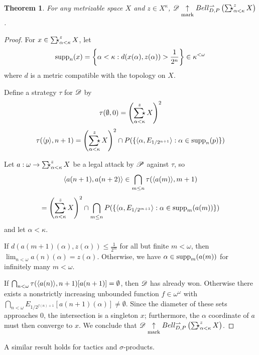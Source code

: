\documentclass{amsart}
\newtheorem{theorem}{Theorem}[section]
\theoremstyle{definition}
\begin{document}
  \begin{theorem}
    For any metrizable space \(X\) and \(z\in X^\kappa\),
    \(\pl D\markwin\bellConGame{\SigmaStarProd_{\alpha<\kappa}^z X}\).
  \end{theorem}

  \begin{proof}
    For \(x\in\SigmaStarProd_{\alpha<\kappa}^z X\), let
      \[
        \textrm{supp}_n(x)
          =
        \left\{
          \alpha<\kappa
        :
          d(x(\alpha),z(\alpha))>\frac{1}{2^n}
        \right\}
          \in
        \kappa^{<\omega}
      \]
    where \(d\) is a metric compatible with the topology on \(X\).

    Define a strategy \(\tau\) for \(\mathscr{D}\) by
      \[
        \tau(\emptyset,0)
          =
        \left(\SigmaStarProd_{\alpha<\kappa}^z X\right)^2
      \]
      \[
        \tau(\<p\>,n+1)
          =
        \left(\SigmaStarProd_{\alpha<\kappa}^z X\right)^2
          \cap
        P(\{
          \<\alpha,E_{1/2^{n+1}}\>
            :
          \alpha\in\supp_n(p)
        \})
      \]

    Let \(a:\omega\to \SigmaStarProd_{\alpha<\kappa}^z X\) be a legal
    attack by \(\mathscr{P}\) against \(\tau\), so
      \[
        \langle a(n+1),a(n+2)\rangle
          \in
        \bigcap_{m\leq n}
        \tau(\langle a(m)\rangle,m+1)
      \]
      \[
          =
        \left(\SigmaStarProd_{\alpha<\kappa}^z X\right)^2
          \cap
        \bigcap_{m\leq n}
        P(\{
          \<\alpha,E_{1/2^{m+1}}\>
            :
          \alpha\in\supp_m(a(m))
        \})
      \]
    and let \(\alpha<\kappa\).

    If \(d(a(m+1)(\alpha),z(\alpha))\leq\frac{1}{2^m}\) for all but finite
    \(m<\omega\), then  \(\lim_{n<\omega}a(n)(\alpha)=z(\alpha)\).
    Otherwise, we have \(\alpha\in\textrm{supp}_m(a(m))\) for infinitely many
    \(m<\omega\).

    If
    \(\bigcap_{n<\omega}\tau(\langle a(n)\rangle,n+1)[a(n+1)]=\emptyset\), then
    \(\mathscr{D}\) has already won.
    Otherwise there exists a nonstrictly increasing
    unbounded function \(f\in\omega^\omega\) with
    \(\bigcap_{n<\omega}E_{1/2^{f(n)+1}}[a(n+1)(\alpha)]\not=\emptyset\).
    Since the diameter of these sets approaches \(0\), the intersection is
    a singleton \(x\); furthermore, the \(\alpha\) coordinate of \(a\) must
    then converge to \(x\). We conclude that
    \(\pl D\markwin\bellConGame{\SigmaStarProd_{\alpha<\kappa}^z X}\).
  \end{proof}

  A similar result holds for tactics and
  \(\sigma\)-products.
\end{document}
